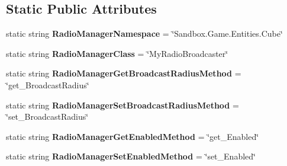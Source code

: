 \subsection*{Static Public Attributes}
\begin{DoxyCompactItemize}
\item 
\hypertarget{class_s_e_mod_a_p_i_internal_1_1_a_p_i_1_1_common_1_1_radio_manager_a8a9076b55adeefafb2cc60d8fcf902f6}{}static string {\bfseries Radio\+Manager\+Namespace} = \char`\"{}Sandbox.\+Game.\+Entities.\+Cube\char`\"{}\label{class_s_e_mod_a_p_i_internal_1_1_a_p_i_1_1_common_1_1_radio_manager_a8a9076b55adeefafb2cc60d8fcf902f6}

\item 
\hypertarget{class_s_e_mod_a_p_i_internal_1_1_a_p_i_1_1_common_1_1_radio_manager_af96576bf2205e359f3c1c671cab0964f}{}static string {\bfseries Radio\+Manager\+Class} = \char`\"{}My\+Radio\+Broadcaster\char`\"{}\label{class_s_e_mod_a_p_i_internal_1_1_a_p_i_1_1_common_1_1_radio_manager_af96576bf2205e359f3c1c671cab0964f}

\item 
\hypertarget{class_s_e_mod_a_p_i_internal_1_1_a_p_i_1_1_common_1_1_radio_manager_a60abc6e43be7b9799427c181c33b8622}{}static string {\bfseries Radio\+Manager\+Get\+Broadcast\+Radius\+Method} = \char`\"{}get\+\_\+\+Broadcast\+Radius\char`\"{}\label{class_s_e_mod_a_p_i_internal_1_1_a_p_i_1_1_common_1_1_radio_manager_a60abc6e43be7b9799427c181c33b8622}

\item 
\hypertarget{class_s_e_mod_a_p_i_internal_1_1_a_p_i_1_1_common_1_1_radio_manager_a58d1a77635f62b661a2ebb8da69f7be1}{}static string {\bfseries Radio\+Manager\+Set\+Broadcast\+Radius\+Method} = \char`\"{}set\+\_\+\+Broadcast\+Radius\char`\"{}\label{class_s_e_mod_a_p_i_internal_1_1_a_p_i_1_1_common_1_1_radio_manager_a58d1a77635f62b661a2ebb8da69f7be1}

\item 
\hypertarget{class_s_e_mod_a_p_i_internal_1_1_a_p_i_1_1_common_1_1_radio_manager_a005a62f39aa4e3b391c8696463e4f7be}{}static string {\bfseries Radio\+Manager\+Get\+Enabled\+Method} = \char`\"{}get\+\_\+\+Enabled\char`\"{}\label{class_s_e_mod_a_p_i_internal_1_1_a_p_i_1_1_common_1_1_radio_manager_a005a62f39aa4e3b391c8696463e4f7be}

\item 
\hypertarget{class_s_e_mod_a_p_i_internal_1_1_a_p_i_1_1_common_1_1_radio_manager_a46561abecfc4f71b35aa5cbd6cc84365}{}static string {\bfseries Radio\+Manager\+Set\+Enabled\+Method} = \char`\"{}set\+\_\+\+Enabled\char`\"{}\label{class_s_e_mod_a_p_i_internal_1_1_a_p_i_1_1_common_1_1_radio_manager_a46561abecfc4f71b35aa5cbd6cc84365}


\end{DoxyCompactItemize}
